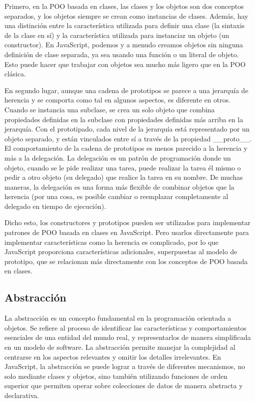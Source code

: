 \documentclass{article}
\begin{document}
Primero, en la POO basada en clases, las clases y los objetos son dos 
conceptos separados, y los objetos siempre se crean como instancias de 
clases. Además, hay una distinción entre la característica utilizada para 
definir una clase (la sintaxis de la clase en sí) y la característica 
utilizada para instanciar un objeto (un constructor). En JavaScript, 
podemos y a menudo creamos objetos sin ninguna definición de clase 
separada, ya sea usando una función o un literal de objeto. Esto puede hacer 
que trabajar con objetos sea mucho más ligero que en la POO clásica.

En segundo lugar, aunque una cadena de prototipos se parece a una jerarquía 
de herencia y se comporta como tal en algunos aspectos, es diferente en 
otros. Cuando se instancia una subclase, se crea un solo objeto que combina 
propiedades definidas en la subclase con propiedades definidas más arriba 
en la jerarquía. Con el prototipado, cada nivel de la jerarquía está 
representado por un objeto separado, y están vinculados entre sí a través 
de la propiedad \_\_proto\_\_. El comportamiento de la cadena de prototipos 
es menos parecido a la herencia y más a la delegación. La delegación es un 
patrón de programación donde un objeto, cuando se le pide realizar una 
tarea, puede realizar la tarea él mismo o pedir a otro objeto (su delegado) 
que realice la tarea en su nombre. De muchas maneras, la delegación es una 
forma más flexible de combinar objetos que la herencia 
(por una cosa, es posible cambiar o reemplazar completamente al delegado en 
tiempo de ejecución).

Dicho esto, los constructores y prototipos pueden ser utilizados para 
implementar patrones de POO basada en clases en JavaScript. Pero usarlos 
directamente para implementar características como la herencia es complicado, 
por lo que JavaScript proporciona características adicionales, superpuestas 
al modelo de prototipo, que se relacionan más directamente con los conceptos 
de POO basada en clases.

\subsection{Abstracción}

La abstracción es un concepto fundamental en la programación orientada a 
objetos. Se refiere al proceso de identificar las características y 
comportamientos esenciales de una entidad del mundo real, y representarlos 
de manera simplificada en un modelo de software. La abstracción permite 
manejar la complejidad al centrarse en los aspectos relevantes y omitir los 
detalles irrelevantes. En JavaScript, la abstracción se puede lograr a 
través de diferentes mecanismos, no solo mediante clases y objetos, sino 
también utilizando funciones de orden superior que permiten operar sobre 
colecciones de datos de manera abstracta y declarativa.
\end{document}
